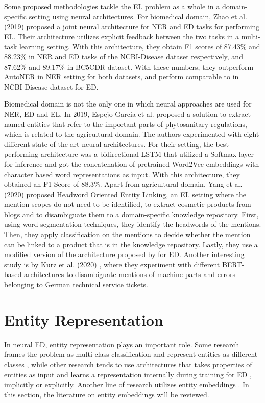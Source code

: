 \documentclass{report}
\theoremstyle{definition}
\theoremstyle{remark}
\begin{document}
Some proposed methodologies tackle the EL problem as a whole in a domain-specific setting using neural architectures. For biomedical domain, Zhao et al. (2019) \cite{MedFeedback} proposed a joint neural architecture for NER and ED tasks for performing EL. Their architecture utilizes explicit feedback between the two tasks in a multi-task learning setting. With this architecture, they obtain F1 scores of 87.43\% and 88.23\% in NER and ED tasks of the NCBI-Disease \cite{ncbi} dataset respectively, and 87.62\% and 89.17\% in BC5CDR \cite{bc5cdr} dataset. With these numbers, they outperform AutoNER \cite{NERDict2} in NER setting for both datasets, and perform comparable to \cite{MedicalTriplet} in NCBI-Disease dataset for ED.

Biomedical domain is not the only one in which neural approaches are used for NER, ED and EL. In 2019, Espejo-Garcia et al. \cite{agricultural} proposed a solution to extract named entities that refer to the important parts of phytosanitary regulations, which is related to the agricultural domain. The authors experimented with eight different state-of-the-art neural architectures. For their setting, the best performing architecture was a bidirectional LSTM \cite{bilstm} that utilized a Softmax layer for inference and got the concatenation of pretrained Word2Vec \cite{w2v} embeddings with character based word representations as input. With this architecture, they obtained an F1 Score of 88.3\%. Apart from agricultural domain, Yang et al. (2020) \cite{cosmetic} proposed Headword Oriented Entity Linking, an EL setting where the mention scopes do not need to be identified, to extract cosmetic products from blogs and to disambiguate them to a domain-specific knowledge repository. First, using word segmentation techniques, they identify the headwords of the mentions. Then, they apply classification on the mentions to decide whether the mention can be linked to a product that is in the knowledge repository. Lastly, they use a modified version of the architecture proposed by \cite{gupta} for ED.  Another interesting study is by Kurz et al. (2020) \cite{TechTickets}, where they experiment with different BERT-based \cite{BERT} architectures to disambiguate mentions of machine parts and errors belonging to German technical service tickets.

\section{Entity Representation}
\label{entityRep}
In neural ED, entity representation plays an important role. Some research frames the problem as multi-class classification and represent entities as different classes \cite{bertEL,MedDiffArc,MedFeedback}, while other research tends to use architectures that takes properties of entities as input and learns a representation internally during training for ED \cite{scalablezeroshot}, implicitly or explicitly. Another line of research utilizes entity embeddings \cite{REL,kolitsas,dca,MedicalTriplet}. In this section, the literature on entity embeddings will be reviewed.
\end{document}
